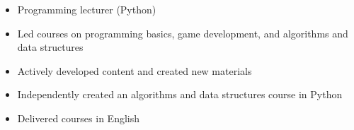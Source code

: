 \documentclass[10pt,a4paper,ragged2e]{altacv}
\begin{document}
\vspace{10px}


\begin{itemize}
\item Programming lecturer (Python)
\item Led courses on programming basics, game development, and algorithms and data structures
\item Actively developed content and created new materials
\item Independently created an algorithms and data structures course in Python
\item Delivered courses in English
\end{itemize}

\nocite{*}
\end{document}
